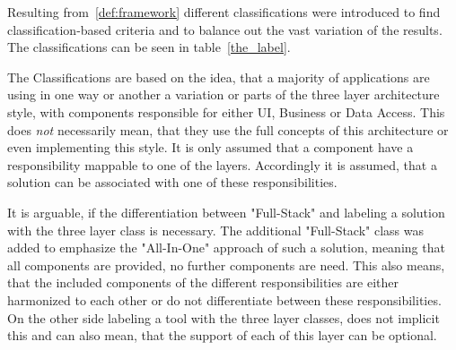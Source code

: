 Resulting from~\ref{def:framework} different classifications were introduced to find classification-based criteria and to balance out the vast variation of the results. The classifications can be seen in table~\ref{the_label}.

The Classifications are based on the idea, that a majority of applications are using in one way or another a variation or parts of the three layer architecture style, with components responsible for either UI, Business or Data Access. This does \textit{not} necessarily mean, that they use the full concepts of this architecture or even implementing this style. It is only assumed that a component have a responsibility mappable to one of the layers. Accordingly it is assumed, that a solution can be associated with one of these responsibilities.

It is arguable, if the differentiation between "Full-Stack" and labeling a solution with the three layer class is necessary. The additional "Full-Stack" class was added to emphasize the "All-In-One" approach of such a solution, meaning that all components are provided, no further components are need. This also means, that the included components of the different responsibilities are either harmonized to each other or do not differentiate between these responsibilities. On the other side labeling a tool with the three layer classes, does not implicit this and can also mean, that the support of each of this layer can be optional.